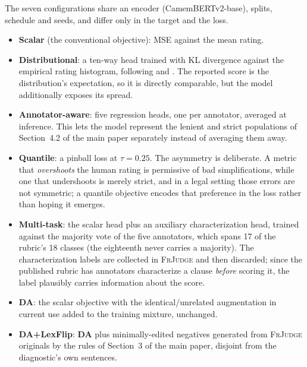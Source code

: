 \documentclass[11pt]{article}
\begin{document}
The seven configurations share an encoder (CamemBERTv2-base), splits, schedule
and seeds, and differ only in the target and the loss.

\begin{itemize}\itemsep2pt
\item \textbf{Scalar} (the conventional objective): MSE against the mean rating.
\item \textbf{Distributional}: a ten-way head trained with KL divergence against
      the empirical rating histogram, following \citet{uma2021learning} and
      \citet{peterson2019human}. The reported score is the distribution's
      expectation, so it is directly comparable, but the model additionally
      exposes its spread.
\item \textbf{Annotator-aware}: five regression heads, one per annotator,
      averaged at inference. This lets the model represent the lenient and
      strict populations of Section~4.2 of the main paper separately instead of
      averaging them away.
\item \textbf{Quantile}: a pinball loss \citep{koenker1978regression} at
      $\tau=0.25$. The asymmetry is deliberate. A metric that
      \emph{overshoots} the human rating is permissive of bad simplifications,
      while one that undershoots is merely strict, and in a legal setting those
      errors are not symmetric; a quantile objective encodes that preference in
      the loss rather than hoping it emerges.
\item \textbf{Multi-task}: the scalar head plus an auxiliary characterization
      head, trained against the majority vote of the five annotators, which
      spans 17 of the rubric's 18 classes (the eighteenth never carries a
      majority). The characterization labels are collected in \textsc{FrJudge}
      and then discarded; since the published rubric has annotators characterize
      a clause \emph{before} scoring it, the label plausibly carries information
      about the score.
\item \textbf{DA}: the scalar objective with the identical/unrelated
      augmentation in current use added to the training mixture, unchanged.
\item \textbf{DA+LexFlip}: \textbf{DA} plus minimally-edited negatives
      generated from \textsc{FrJudge} originals by the rules of
      Section~3 of the main paper, disjoint from the diagnostic's own sentences.
\end{itemize}
\end{document}
